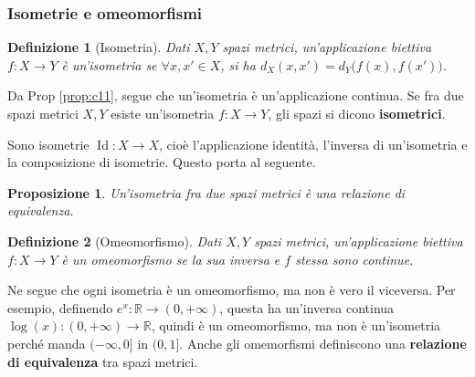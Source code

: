 \documentclass[12pt]{scrartcl}
\theoremstyle{style}
\newtheorem{definizione}{Definizione}[section]
\newtheorem{prop}{Proposizione}[section]
\numberwithin{equation}{subsection}
\renewcommand{\textbf}[1]{\textsf{\bfseries #1}}
\begin{document}
\subsubsection{Isometrie e omeomorfismi}
\begin{definizione}
	[Isometria]
	Dati $X,Y$ spazi metrici, un'applicazione biettiva $f:X\to Y$ \`e un'isometria se $\forall x,x' \in X$, si ha $d_X(x,x') = d_Y\big(f(x),f(x')\big)$.
\end{definizione}
\noindent Da Prop \ref{prop:c11}, segue che un'isometria \`e un'applicazione continua. Se fra due spazi metrici $X,Y$ esiste un'isometria $f:X\to Y$, gli spazi si dicono \textbf{isometrici}. 

Sono isometrie $\operatorname{Id} : X \to X$, cio\`e l'applicazione identit\`a, l'inversa di un'isometria e la composizione di isometrie. Questo porta al seguente.
\begin{prop}
	Un'isometria fra due spazi metrici \`e una relazione di equivalenza.	
\end{prop}
\begin{definizione}
	[Omeomorfismo]
	Dati $X,Y$ spazi metrici, un'applicazione biettiva $f:X\to Y$ \`e un \textit{omeomorfismo} se la sua inversa e $f$ stessa sono continue.
\end{definizione}
\noindent Ne segue che ogni isometria \`e un omeomorfismo, ma non \`e vero il viceversa. Per esempio, definendo $e^x : \mathbb{R} \to (0,+\infty)$, questa ha un'inversa continua $\log(x) : (0,+\infty) \to \mathbb{R}$, quindi \`e un omeomorfismo, ma non \`e un'isometria perch\'e manda $(-\infty,0]$ in $(0,1]$.
Anche gli omemorfismi definiscono una \textbf{relazione di equivalenza} tra spazi metrici.
\end{document}
